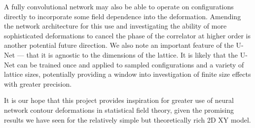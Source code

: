 \documentclass[12pt]{article}
\begin{document}
A fully convolutional network may also be able to operate on configurations directly to incorporate some field dependence into the deformation. Amending
the network architecture for this use and investigating the ability of more sophisticated deformations to cancel the phase of the correlator
at higher order is another potential future direction. We also note an important feature of the U-Net --- that it is agnostic to the dimensions of the lattice. It is likely that the U-Net can be trained once
and applied to sampled configurations and a variety of lattice sizes, potentially providing a window into investigation of
finite size effects with greater precision. 

It is our hope that this project provides inspiration for greater use of neural network contour deformations in statistical field theory, given
the promising results we have seen for the relatively simple but theoretically rich 2D XY model.





\newpage

\printbibliography
\end{document}
